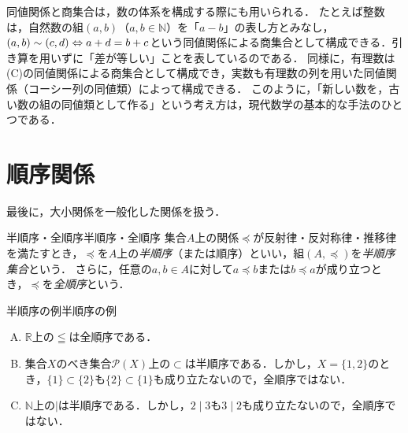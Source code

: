 \begin{mycolumn}
  同値関係と商集合は，数の体系を構成する際にも用いられる．
  たとえば整数は，自然数の組$(a, b)$（$a, b \in \mathbb{N}$）を「$a - b$」の表し方とみなし，$(a, b) \sim (c, d) \mathrel{\Leftrightarrow} a + d = b + c$という同値関係による商集合として構成できる．引き算を用いずに「差が等しい」ことを表しているのである．
  同様に，有理数は(C)の同値関係による商集合として構成でき，実数も有理数の列を用いた同値関係（コーシー列の同値類）によって構成できる．
  このように，「新しい数を，古い数の組の同値類として作る」という考え方は，現代数学の基本的な手法のひとつである．
\end{mycolumn}

\section{順序関係}

最後に，大小関係を一般化した関係を扱う．

\begin{definition}{半順序・全順序}{半順序・全順序}
  集合$A$上の関係$\preceq$が反射律・反対称律・推移律を満たすとき，$\preceq$を$A$上の\emph{半順序}（または順序）といい，組$(A, \preceq)$を\emph{半順序集合}という．
  さらに，任意の$a, b \in A$に対して$a \preceq b$または$b \preceq a$が成り立つとき，$\preceq$を\emph{全順序}という．
\end{definition}

\begin{example}{半順序の例}{半順序の例}
  \begin{enumerate}[(A)]
    \item $\mathbb{R}$上の$\leqq$は全順序である．
    \item 集合$X$のべき集合$\mathcal{P}(X)$上の$\subset$は半順序である．しかし，$X = \{1, 2\}$のとき，$\{1\} \subset \{2\}$も$\{2\} \subset \{1\}$も成り立たないので，全順序ではない．
    \item $\mathbb{N}$上の$\mid$は半順序である．しかし，$2 \mid 3$も$3 \mid 2$も成り立たないので，全順序ではない．
  \end{enumerate}
\end{example}

